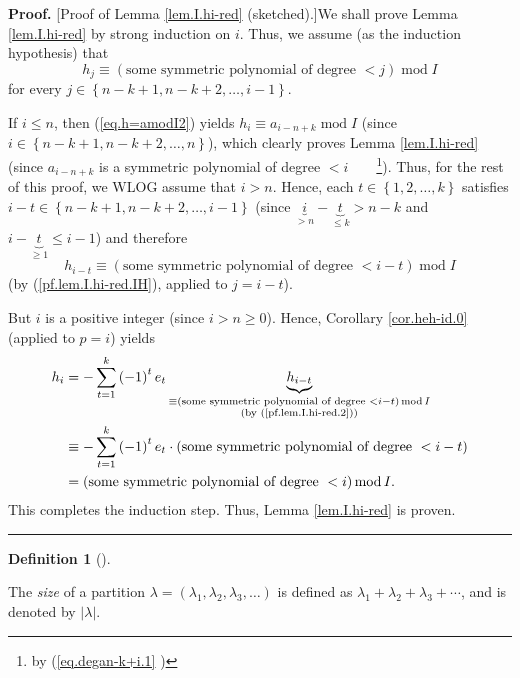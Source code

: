\documentclass[numbers=enddot,12pt,final,onecolumn,notitlepage]{scrartcl}%
\theoremstyle{definition}
\newtheorem{defi}[theo]{Definition}
\newenvironment{definition}[1][]
{\begin{defi}[#1]\begin{leftbar}}
{\end{leftbar}\end{defi}}
\newenvironment{proof}[1][Proof]{\noindent\textbf{#1.} }{\ \rule{0.5em}{0.5em}}
\let\sumnonlimits\sum
\renewcommand{\sum}{\sumnonlimits\limits}
\begin{document}
\begin{proof}
[Proof of Lemma \ref{lem.I.hi-red} (sketched).]We shall prove Lemma
\ref{lem.I.hi-red} by strong induction on $i$. Thus, we assume (as the
induction hypothesis) that%
\begin{equation}
h_{j}\equiv\left(  \text{some symmetric polynomial of degree }<j\right)
\operatorname{mod}I \label{pf.lem.I.hi-red.IH}%
\end{equation}
for every $j\in\left\{  n-k+1,n-k+2,\ldots,i-1\right\}  $.

If $i\leq n$, then (\ref{eq.h=amodI2}) yields $h_{i}\equiv a_{i-n+k}%
\operatorname{mod}I$ (since $i\in\left\{  n-k+1,n-k+2,\ldots,n\right\}  $),
which clearly proves Lemma \ref{lem.I.hi-red} (since $a_{i-n+k}$ is a
symmetric polynomial of degree $<i$\ \ \ \ \footnote{by (\ref{eq.degan-k+i.1}%
)}). Thus, for the rest of this proof, we WLOG assume that $i>n$. Hence, each
$t\in\left\{  1,2,\ldots,k\right\}  $ satisfies \newline$i-t\in\left\{
n-k+1,n-k+2,\ldots,i-1\right\}  $ (since $\underbrace{i}_{>n}-\underbrace{t}%
_{\leq k}>n-k$ and $i-\underbrace{t}_{\geq1}\leq i-1$) and therefore%
\begin{equation}
h_{i-t}\equiv\left(  \text{some symmetric polynomial of degree }<i-t\right)
\operatorname{mod}I \label{pf.lem.I.hi-red.2}%
\end{equation}
(by (\ref{pf.lem.I.hi-red.IH}), applied to $j=i-t$).

But $i$ is a positive integer (since $i>n\geq0$). Hence, Corollary
\ref{cor.heh-id.0} (applied to $p=i$) yields%
\begin{align*}
h_{i}  &  =-\sum_{t=1}^{k}\left(  -1\right)  ^{t}e_{t}\underbrace{h_{i-t}%
}_{\substack{\equiv\left(  \text{some symmetric polynomial of degree
}<i-t\right)  \operatorname{mod}I\\\text{(by (\ref{pf.lem.I.hi-red.2}))}}}\\
&  \equiv-\sum_{t=1}^{k}\left(  -1\right)  ^{t}e_{t}\cdot\left(  \text{some
symmetric polynomial of degree }<i-t\right) \\
&  =\left(  \text{some symmetric polynomial of degree }<i\right)
\operatorname{mod}I.
\end{align*}
This completes the induction step. Thus, Lemma \ref{lem.I.hi-red} is proven.
\end{proof}

\begin{definition}
The \textit{size} of a partition $\lambda=\left(  \lambda_{1},\lambda
_{2},\lambda_{3},\ldots\right)  $ is defined as $\lambda_{1}+\lambda
_{2}+\lambda_{3}+\cdots$, and is denoted by $\left\vert \lambda\right\vert $.
\end{definition}
\end{document}
